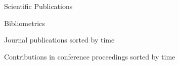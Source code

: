 \documentclass{resume} %
\begin{document}


    \begin{rSection}{Scientific Publications}


        \begin{rNoListSubsection}{Bibliometrics}{}{}{}
            
        \end{rNoListSubsection}


        \setlength{} %

        \begin{rNoListSubsection}{Journal publications sorted by time}{}{}{}
            \nocite{*}
            \printbibliography[type=article,heading=none,omitnumbers=true]{}
        \end{rNoListSubsection}


        \begin{rNoListSubsection}{Contributions in conference proceedings sorted by time}{}{}{}
            \nocite{*}
            \printbibliography[filter=conferences,heading=none,omitnumbers=true]{}
        \end{rNoListSubsection}



\end{rSection}
\end{document}
